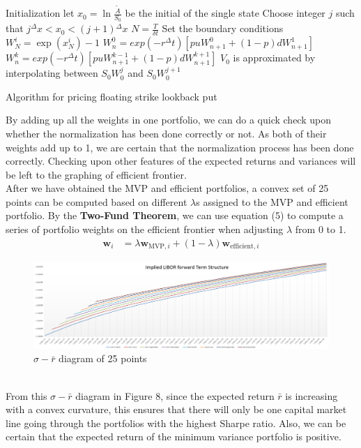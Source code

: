 \begin{algorithm}[H]
 Initialization\;
 let $x_{0} = \ln \frac{\tilde{A}}{S_{0}}$ be the initial  of the single state\;
 Choose integer $j$ such that $j{^{\Delta}x} < x_{0} < (j+1){^{\Delta}x}$\;
 $N = \frac{T}{\delta t}$\;
 Set the boundary conditions\;
  {
  $W_{N}^{i} = \exp(x_{N}^{i}) - 1$\;
 }
  {
   {
    $W_{n}^{0} = exp(-r{^{\Delta}t})[puW_{n+1}^{0}+(1-p)dW_{n+1}^{1}]$\;
  }
   {
    $W_{n}^{k} = exp(-r{^{\Delta}t})[puW_{n+1}^{k-1}+(1-p)dW_{n+1}^{k+1}]$\;
  }
 }
 $V_{0}$ is approximated by interpolating between $S_{0}W_{0}^{j}$ and $S_{0}W_{0}^{j+1}$\;
\caption{Algorithm for pricing floating strike lookback put}
\end{algorithm}
By adding up all the weights in one portfolio, we can do a quick check upon whether the normalization has been done correctly or not. As both of their weights add up to 1, we are certain that the normalization process has been done correctly. Checking upon other features of the expected returns and variances will be left to the graphing of efficient frontier.\\
After we have obtained the MVP and efficient portfolios, a convex set of 25 points can be computed based on different $\lambda$s assigned to the MVP and efficient portfolio. By the \textbf{Two-Fund Theorem}, we can use equation (5) to compute a series of portfolio weights on the efficient frontier when adjusting $\lambda$ from 0 to 1.
\begin{equation}
\begin{split}
\textbf{w}_{i} &= \lambda \textbf{w}_{\text{MVP}, i} + (1 - \lambda) \textbf{w}_{\text{efficient}, i}
\end{split}
\end{equation}
\begin{figure}[h]
	\centering
	\includegraphics[scale=0.5]{biu.PNG}
	\caption{$\sigma-\bar{r}$ diagram of 25 points}
\end{figure}
\\From this $\sigma-\bar{r}$ diagram in Figure 8, since the expected return $\bar{r}$ is increasing with a convex curvature, this ensures that there will only be one capital market line going through the portfolios with the highest Sharpe ratio. Also, we can be certain that the expected return of the minimum variance portfolio is positive.
\newpage

